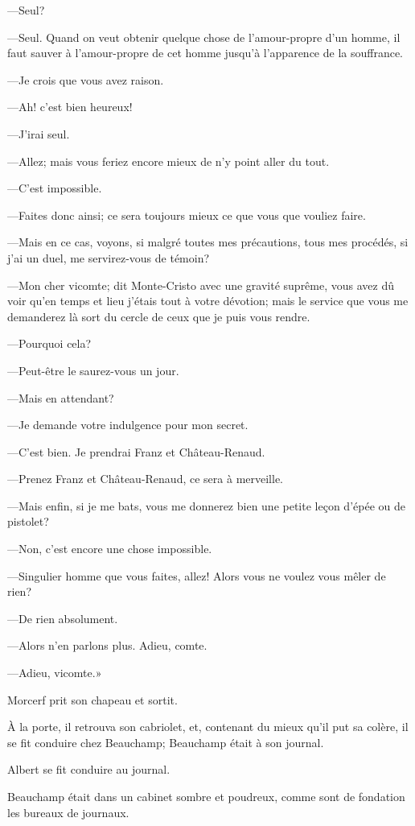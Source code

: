 —Seul? 

—Seul. Quand on veut obtenir quelque chose de l'amour-propre d'un homme, il faut sauver à l'amour-propre de cet homme jusqu'à l'apparence de la souffrance. 

—Je crois que vous avez raison. 

—Ah! c'est bien heureux! 

—J'irai seul.  

—Allez; mais vous feriez encore mieux de n'y point aller du tout. 

—C'est impossible. 

—Faites donc ainsi; ce sera toujours mieux ce que vous que vouliez faire. 

—Mais en ce cas, voyons, si malgré toutes mes précautions, tous mes procédés, si j'ai un duel, me servirez-vous de témoin? 

—Mon cher vicomte; dit Monte-Cristo avec une gravité suprême, vous avez dû voir qu'en temps et lieu j'étais tout à votre dévotion; mais le service que vous me demanderez là sort du cercle de ceux que je puis vous rendre. 

—Pourquoi cela? 

—Peut-être le saurez-vous un jour. 

—Mais en attendant? 

—Je demande votre indulgence pour mon secret. 

—C'est bien. Je prendrai Franz et Château-Renaud. 

—Prenez Franz et Château-Renaud, ce sera à merveille. 

—Mais enfin, si je me bats, vous me donnerez bien une petite leçon d'épée ou de pistolet? 

—Non, c'est encore une chose impossible. 

—Singulier homme que vous faites, allez! Alors vous ne voulez vous mêler de rien? 

—De rien absolument. 

—Alors n'en parlons plus. Adieu, comte. 

—Adieu, vicomte.» 

Morcerf prit son chapeau et sortit. 

À la porte, il retrouva son cabriolet, et, contenant du mieux qu'il put sa colère, il se fit conduire chez Beauchamp; Beauchamp était à son journal. 

Albert se fit conduire au journal. 

Beauchamp était dans un cabinet sombre et poudreux, comme sont de fondation les bureaux de journaux. 

